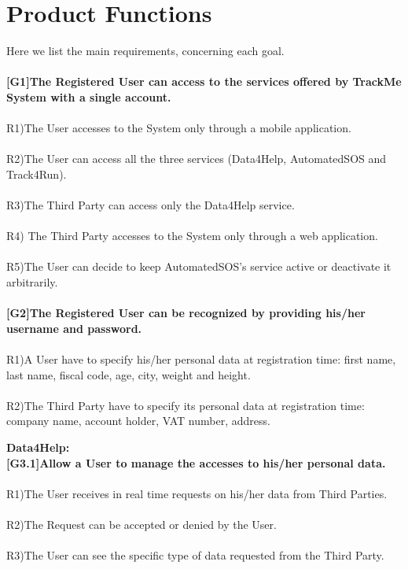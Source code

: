 \section{Product Functions}

Here we list the main requirements, concerning each goal. \\ \\

\textbf{[G1]The Registered User can access to the services offered by TrackMe System with a single account. } \\ \\
R1)The User accesses to the System only through a mobile application. \\ \\
R2)The User can access all the three services (Data4Help, AutomatedSOS and Track4Run). \\ \\
R3)The Third Party can access only the Data4Help service. \\ \\
R4) The Third Party accesses to the System only through a web application. \\ \\
R5)The User can decide to keep AutomatedSOS's service active or deactivate it arbitrarily. \\ \\

\textbf{[G2]The Registered User can be recognized by providing his/her username and password.} \\ \\
R1)A User  have to specify his/her personal data at registration time: first name, last name, fiscal code, age, city, weight and height. \\ \\
R2)The Third Party have to specify its personal data at registration time: company name, account holder, VAT number, address. \newline \newline

\textbf{Data4Help:} \\

\textbf{[G3.1]Allow a User to manage the accesses to his/her personal data.} \\ \\
R1)The User receives in real time requests on his/her data from Third Parties. \\ \\
R2)The Request can be accepted or denied by the User.\\ \\
R3)The User can see the specific type of data requested from the Third Party. \\ \\ 

